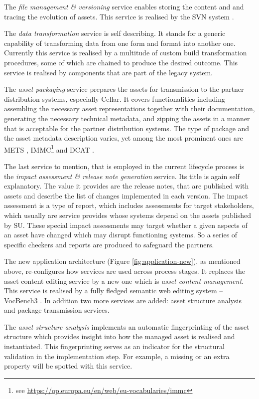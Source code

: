 	The \textit{file management \& versioning} service enables storing the content and and tracing the evolution of assets. This service is realised by the SVN system \cite{svn}.
	
	The \textit{data transformation} service is self describing. It stands for a generic capability of transforming data from one form and format into another one. Currently this service is realised by a multitude of custom build transformation procedures, some of which are chained to produce the desired outcome. This service is realised by components that are part of the legacy system. 
	
	The \textit{asset packaging} service prepares the assets for transmission to the partner distribution systems, especially Cellar. It covers functionalities including assembling the necessary asset representations together with their documentation, generating the necessary technical metadata, and zipping the assets in a manner that is acceptable for the partner distribution systems. The type of package and the asset metadata description varies, yet among the most prominent ones are METS \citep{mets}, IMMC\footnote{see \url{https://op.europa.eu/en/web/eu-vocabularies/immc}} and DCAT \cite{dcat2}. 
	
	The last service to mention, that is employed in the current lifecycle process is the \textit{impact assessment \& release note generation} service. Its title is again self explanatory. The value it provides are the release notes, that are published with assets and describe the list of changes implemented in each version. The impact assessment is a type of report, which includes assessments for target stakeholders, which usually are service provides whose systems depend on the assets published by SU. These special impact assessments may target whether a given aspects of an asset have changed which may disrupt functioning systems. So a series of specific checkers and reports are produced to safeguard the partners. 
	
	The new application architecture (Figure \ref{fig:application-new}), as mentioned above, re-configures how services are used across process stages. It replaces the asset content editing service by a new one which is \textit{asset content management}. This service is realised by a fully fledged semantic web editing system -- VocBench3 \citep{stellatovocbench}. In addition two more services are added: asset structure analysis and package transmission services.
	
	The \textit{asset structure analysis} implements an automatic fingerprinting of the asset structure which provides insight into how the managed asset is realised and instantiated. This fingerprinting serves as an indicator for the structural validation in the implementation step. For example, a missing or an extra property will be spotted with this service. 
	
